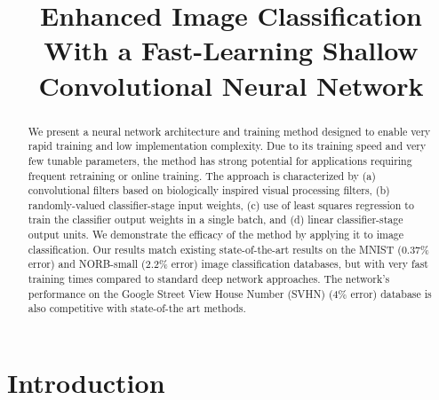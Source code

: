 \documentclass[conference]{IEEEtran}
\begin{document}
%
\title{Enhanced Image Classification With a Fast-Learning Shallow Convolutional Neural Network}


\author{
}




\maketitle


\begin{abstract}
We present a neural network architecture and training method designed to enable very rapid training and low implementation complexity. Due to its training speed and very few  tunable parameters, the method has strong potential for applications requiring frequent retraining or online training. The approach is characterized by (a) convolutional filters based on biologically inspired visual processing filters, (b) randomly-valued classifier-stage input weights, (c) use of least squares regression to train the classifier output weights in a single batch, and (d) linear classifier-stage output units.  We demonstrate the efficacy of the method by applying it to image classification. Our results match existing state-of-the-art results on the MNIST (0.37\% error) and NORB-small (2.2\% error) image classification databases, but with very fast training times compared to standard deep network approaches. The network's performance on the Google Street View House Number (SVHN) (4\% error) database is  also competitive with state-of-the art methods.

\end{abstract}

\IEEEpeerreviewmaketitle


\section{Introduction}
\end{document}
